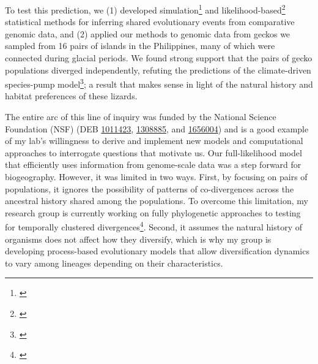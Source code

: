 To test this prediction, we
(1) developed
simulation\footnote{\label{Oaks14dpp}\hspace{-0.8em}}
and
likelihood-based\footnote{\label{Oaks18ecoevolity}\hspace{-0.8em}}
statistical methods for inferring shared evolutionary events from comparative
genomic data, and
(2) applied our methods to genomic data from geckos we sampled from 16 pairs of
islands in the Philippines, many of which were connected during glacial
periods.
We found strong support that the pairs of gecko populations diverged
independently,
refuting the predictions of the climate-driven species-pump
model\footnote{\label{Oaks18paic}\hspace{-0.8em}};
a result that makes sense in light of the natural history and habitat
preferences of these lizards.

The entire arc of this line of inquiry was funded by the National Science
Foundation (NSF)
(DEB
\href{https://www.nsf.gov/awardsearch/showAward?AWD_ID=1011423}{1011423},
\href{https://www.nsf.gov/awardsearch/showAward?AWD_ID=1308885}{1308885},
and
\href{https://www.nsf.gov/awardsearch/showAward?AWD_ID=1656004}{1656004})
and is a good example of my lab's willingness to derive and implement new
models and computational approaches to interrogate questions that motivate us.
Our full-likelihood model that efficiently uses information
from genome-scale data was a step forward for biogeography.
However,
it was limited in two ways.
First,
by focusing on pairs of populations, it ignores the possibility of patterns of
co-divergences across the ancestral history shared among the populations.
To overcome this limitation, my research group is currently working on fully
phylogenetic approaches to testing for temporally clustered
divergences\footnote{\label{Oaks21phycoeval}\hspace{-0.8em}}.
Second, it assumes the natural history of organisms does not affect how they
diversify, which is why my group is developing process-based evolutionary
models that allow diversification dynamics to vary among lineages depending on
their characteristics.


